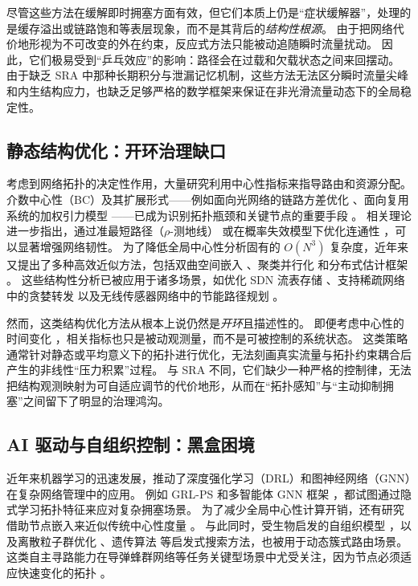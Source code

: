 \documentclass[journal]{IEEEtran}
\theoremstyle{plain}
\theoremstyle{definition}
\begin{document}
尽管这些方法在缓解即时拥塞方面有效，但它们本质上仍是“症状缓解器”，处理的是缓存溢出或链路饱和等表层现象，而不是其背后的\textit{结构性根源}。
由于把网络代价地形视为不可改变的外在约束，反应式方法只能被动追随瞬时流量扰动。
因此，它们极易受到“乒乓效应”的影响：路径会在过载和欠载状态之间来回摆动。
由于缺乏 SRA 中那种长期积分与泄漏记忆机制，这些方法无法区分瞬时流量尖峰和内生结构应力，也缺乏足够严格的数学框架来保证在非光滑流量动态下的全局稳定性。

\subsection{静态结构优化：开环治理缺口}

考虑到网络拓扑的决定性作用，大量研究利用中心性指标来指导路由和资源分配。
介数中心性（BC）及其扩展形式——例如面向光网络的链路方差优化 \cite{Upadhyay2024OpticalBC}、面向复用系统的加权引力模型 \cite{Ni2023Gravity}——已成为识别拓扑瓶颈和关键节点的重要手段 \cite{Basaras2019Influential, Wehmuth2021SpuriousPaths}。
相关理论进一步指出，通过准最短路径（$\rho$-测地线） \cite{DeMedeiros2017QuasiShortest} 或在概率失效模型下优化连通性 \cite{Cavallaro2022Connectivity}，可以显著增强网络韧性。
为了降低全局中心性分析固有的 $O(N^3)$ 复杂度，近年来又提出了多种高效近似方法，包括双曲空间嵌入 \cite{Stai2017Hyperbolic}、聚类并行化 \cite{Suppa2015FastBC} 和分布式估计框架 \cite{Maccari2020DistributedLoad, Maccari2018DistributedDV}。
这些结构性分析已被应用于诸多场景，如优化 SDN 流表存储 \cite{Ma2019FlowTable}、支持稀疏网络中的贪婪转发 \cite{Ahmed2025SparseNet} 以及无线传感器网络中的节能路径规划 \cite{Oliveira2010WSNcentrality}。

然而，这类结构优化方法从根本上说仍然是\textit{开环}且描述性的。
即便考虑中心性的时间变化 \cite{Ghanem2019DynamicCentrality}，相关指标也只是被动观测量，而不是可被控制的系统状态。
这类策略通常针对静态或平均意义下的拓扑进行优化，无法刻画真实流量与拓扑约束耦合后产生的非线性“压力积累”过程。
与 SRA 不同，它们缺少一种严格的控制律，无法把结构观测映射为可自适应调节的代价地形，从而在“拓扑感知”与“主动抑制拥塞”之间留下了明显的治理鸿沟。

\subsection{AI 驱动与自组织控制：黑盒困境}

近年来机器学习的迅速发展，推动了深度强化学习（DRL）和图神经网络（GNN）在复杂网络管理中的应用。
例如 GRL-PS \cite{Wei2023GRLPS} 和多智能体 GNN 框架 \cite{Feng2025MultiAgentGNN}，都试图通过隐式学习拓扑特征来应对复杂拥塞场景。
为了减少全局中心性计算开销，还有研究借助节点嵌入来近似传统中心性度量 \cite{Mendonca2021ApproxCentrality}。
与此同时，受生物启发的自组织模型 \cite{Cheng2010SelfOrganizingModel, Guo2010HybridSelfOrg, Li2014PhysarumMulticast}，以及离散粒子群优化 \cite{Wang2019DPSO}、遗传算法 \cite{Mu2024CarrierSelfOrg} 等启发式搜索方法，也被用于动态簇式路由场景。
这类自主寻路能力在导弹蜂群网络等任务关键型场景中尤受关注，因为节点必须适应快速变化的拓扑 \cite{Lu2022MissileSwarm}。
\end{document}
